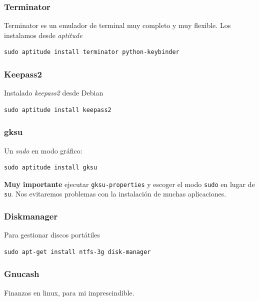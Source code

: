 \documentclass[12pt,spanish,]{scrartcl}
\begin{document}
\subsubsection{Terminator}\label{terminator}

Terminator es un emulador de terminal muy completo y muy flexible. Los
instalamos desde \emph{aptitude}

\begin{verbatim}
sudo aptitude install terminator python-keybinder
\end{verbatim}

\subsubsection{Keepass2}\label{keepass2}

Instalado \emph{keepass2} desde Debian

\begin{verbatim}
sudo aptitude install keepass2
\end{verbatim}

\subsubsection{gksu}\label{gksu}

Un \emph{sudo} en modo gráfico:

\begin{verbatim}
sudo aptitude install gksu
\end{verbatim}

\textbf{Muy importante} ejecutar \texttt{gksu-properties} y escoger el
modo \texttt{sudo} en lugar de \texttt{su}. Nos evitaremos problemas con
la instalación de muchas aplicaciones.

\subsubsection{Diskmanager}\label{diskmanager}

Para gestionar discos portátiles

\begin{verbatim}
sudo apt-get install ntfs-3g disk-manager
\end{verbatim}

\subsubsection{Gnucash}\label{gnucash}

Finanzas en linux, para mi imprescindible.
\end{document}
